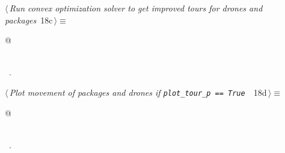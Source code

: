 \documentclass[10pt, english, oneside]{report}
\begin{document}
\begin{flushleft} \small
\begin{minipage}{\linewidth}\label{scrap20}\raggedright\small
{} $\langle\,${\itshape Run convex optimization solver to get improved tours for drones and packages}\nobreak\ {\footnotesize {18c}}$\,\rangle\equiv$
\vspace{-1ex}
\begin{list}{}{} \item
\mbox{}\verb@   @\\
\mbox{}\verb@pass@\\
\mbox{}\verb@@{\NWsep}
\end{list}
\vspace{-1.5ex}
\footnotesize
\begin{list}{}{\setlength{\itemsep}{-\parsep}\setlength{\itemindent}{-\leftmargin}}
\item \NWtxtMacroRefIn\ .

\item{}
\end{list}
\end{minipage}\vspace{4ex}
\end{flushleft}


\begin{flushleft} \small
\begin{minipage}{\linewidth}\label{scrap21}\raggedright\small
{} $\langle\,${\itshape Plot movement of packages and drones if \verb|plot_tour_p == True |}\nobreak\ {\footnotesize {18d}}$\,\rangle\equiv$
\vspace{-1ex}
\begin{list}{}{} \item
\mbox{}\verb@   @\\
\mbox{}\verb@pass@\\
\mbox{}\verb@@{\NWsep}
\end{list}
\vspace{-1.5ex}
\footnotesize
\begin{list}{}{\setlength{\itemsep}{-\parsep}\setlength{\itemindent}{-\leftmargin}}
\item \NWtxtMacroRefIn\ .

\item{}
\end{list}
\end{minipage}\vspace{4ex}
\end{flushleft}
\end{document}
